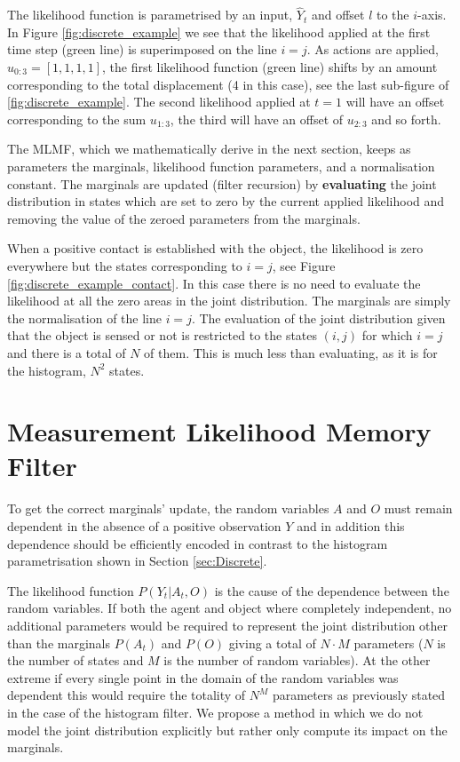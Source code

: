 The likelihood function is parametrised by an input, $\hat{Y}_t$ and offset $l$ to the $i$-axis. In Figure \ref{fig:discrete_example} we see that
the likelihood applied at the first time step (green line) is superimposed on the line $i=j$. As actions are applied, $u_{0:3}=[1,1,1,1]$, 
the first likelihood function (green line) shifts by an amount corresponding to the total displacement (4 in this case), see the last sub-figure of
\ref{fig:discrete_example}. The second likelihood applied at $t=1$ will have an offset corresponding to the sum $u_{1:3}$, the third will have 
an offset of $u_{2:3}$ and so forth.

The MLMF, which we mathematically derive in the next section, keeps as parameters the marginals, likelihood function parameters, and a normalisation 
constant. The marginals are updated (filter recursion) by \textbf{evaluating} the joint distribution in states which are set to zero by the current 
applied likelihood and removing the value of the zeroed parameters from the marginals. 

When a positive contact is established with the object, the likelihood is zero everywhere but the states corresponding to  $i=j$, 
see Figure \ref{fig:discrete_example_contact}. In this case there is no need to evaluate the likelihood at all the zero areas 
in the joint distribution. The marginals are simply the normalisation of the line $i=j$. The evaluation of the joint distribution 
given that the object is sensed or not is restricted to the states $(i,j)$ for which $i=j$ and there is a total of $N$ of them. 
This is much less than evaluating, as it is for the histogram, $N^2$ states.


\FloatBarrier
\section{Measurement Likelihood Memory Filter}\label{ch5:MLMF}

To get the correct marginals' update, the random variables $A$ and $O$ must remain 
dependent in the absence of a positive observation $Y$ and in addition this dependence should be efficiently encoded in contrast to the
histogram parametrisation shown in Section \ref{sec:Discrete}. 

The likelihood function $P(Y_t|A_t,O)$ is the cause of the dependence between the random variables. If both the agent and object 
where completely independent, no additional parameters would be required to represent the joint distribution other than the marginals 
$P(A_t)$ and $P(O)$ giving a total of $N \cdot M$ parameters ($N$ is the number of states and $M$ is the number of random variables). 
At the other extreme if every single point in the domain of the random variables was dependent this would require the totality 
of $N^M$ parameters as previously stated in the case of the histogram filter. We propose a method in which we do not model the joint
distribution explicitly but rather only compute its impact on the marginals. 

